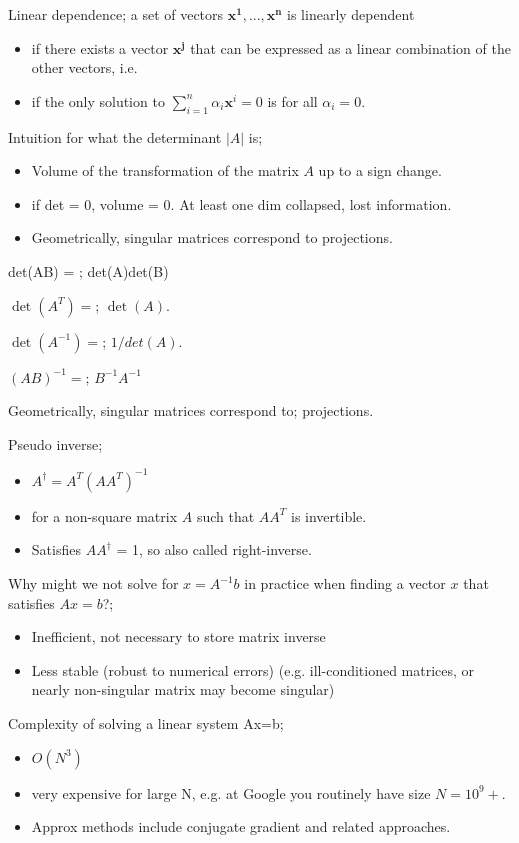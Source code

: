 \documentclass{article}
\begin{document}
	
Linear dependence; a set of vectors $\mathbf{x^1, ..., x^n}$ is linearly dependent  \begin{itemize} \item if there exists a vector $\mathbf{x^j}$ that can be expressed as a linear combination of the other vectors, i.e. \item if the only solution to $\sum_{i=1}^{n}\alpha_i\mathbf{x}^i=0$ is for all $\alpha_i = 0$. \end{itemize}
	
Intuition for what the determinant $|A|$ is; \begin{itemize} \item Volume of the transformation of the matrix $A$ up to a sign change. \item if det = 0, volume = 0. At least one dim collapsed, lost information. \item Geometrically, singular matrices correspond to projections. \end{itemize}

det(AB) = ; det(A)det(B)

$\det(A^T)=$; $\det(A)$.

$\det(A^{-1})=$; $1/det(A)$.

$(AB)^{-1}=$; $B^{-1}A^{-1}$

Geometrically, singular matrices correspond to; projections.

Pseudo inverse; \begin{itemize} \item $A^\dagger=A^T(AA^T)^{-1}$ \item for a non-square matrix $A$ such that $AA^T$ is invertible. \item Satisfies $AA^\dagger$ = 1, so also called right-inverse. \end{itemize}

Why might we not solve for $x=A^{-1}b$ in practice when finding a vector $x$ that satisfies $Ax=b$?; \begin{itemize} \item Inefficient, not necessary to store matrix inverse \item Less stable (robust to numerical errors) (e.g. ill-conditioned matrices, or nearly non-singular matrix may become singular) \end{itemize} 

Complexity of solving a linear system Ax=b; \begin{itemize} \item $O(N^3)$ \item very expensive for large N, e.g. at Google you routinely have size $N=10^9+$. \item Approx methods include conjugate gradient and related approaches. \end{itemize}
	
\end{document}
